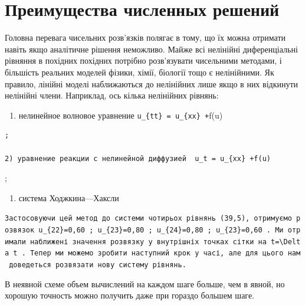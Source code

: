 \documentclass[
  ukrainian,
]{article}
\providecommand{\tightlist}{%
  \setlength{\itemsep}{0pt}\setlength{\parskip}{0pt}}
\begin{document}
\section{Преимущества численных
решений}\label{ux43fux440ux435ux438ux43cux443ux449ux435ux441ux442ux432ux430-ux447ux438ux441ux43bux435ux43dux43dux44bux445-ux440ux435ux448ux435ux43dux438ux439}

Головна перевага чисельних розв'язків полягає в тому, що їх можна
отримати навіть якщо аналітичне рішення неможливо. Майже всі нелінійні
диференціальні рівняння в похідних похідних потрібно розв'язувати
чисельними методами, і більшість реальних моделей фізики, хімії,
біології тощо є нелінійними. Як правило, лінійні моделі наближаються до
нелінійних лише якщо в них відкинути нелінійні члени. Наприклад, ось
кілька нелінійних рівнянь:

\begin{enumerate}
\def\labelenumi{\arabic{enumi})}
\tightlist
\item
  нелинейное волновое уравнение \texttt{u\_\{tt\}\ =\ u\_\{xx\}\ +}f(u)
\end{enumerate}

\begin{verbatim}
;

2) уравнение реакции с нелинейной диффузией  u_t = u_{xx} +f(u)
\end{verbatim}

;

\begin{enumerate}
\def\labelenumi{\arabic{enumi})}
\setcounter{enumi}{2}
\tightlist
\item
  система Ходжкина---Хаксли
\end{enumerate}

\texttt{Застосовуючи\ цей\ метод\ до\ системи\ чотирьох\ рівнянь\ (39,5),\ отримуємо\ розв\textquotesingle{}язок\ \textquotesingle{}u\_\{22\}=0,60\textquotesingle{}\ ;\ \textquotesingle{}u\_\{23\}=0,80\textquotesingle{}\ ;\ \textquotesingle{}u\_\{24\}=0,80\textquotesingle{}\ ;\ \textquotesingle{}u\_\{23\}=0,60\textquotesingle{}\ .\ Ми\ отримали\ наближені\ значення\ розв\textquotesingle{}язку\ у\ внутрішніх\ точках\ сітки\ на\ \textquotesingle{}t=\textbackslash{}Delta\ t\textquotesingle{}\ .\ Тепер\ ми\ можемо\ зробити\ наступний\ крок\ у\ часі,\ але\ для\ цього\ нам\ доведеться\ розв\textquotesingle{}язати\ нову\ систему\ рівнянь.}

В неявной схеме объем вычислений на каждом шаге больше, чем в явной, но
хорошую точность можно получить даже при гораздо большем шаге.
\end{document}
